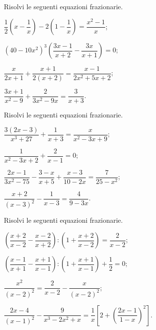 \begin{esercizio}[\Ast]
\label{ese:18.14}
Risolvi le seguenti equazioni frazionarie.
\begin{multicols}{2}
\begin{enumeratea}
 \item $\dfrac{1}{2} \left(x-\dfrac{1}{x}\right)-2\left(1-\dfrac{1}{x}\right)=\dfrac{x^{2}-1}{x}$;
 \item $\left(40-10x^{2}\right)^{3} \left(\dfrac{3x-1}{x+2}-\dfrac{3x}{x+1}\right)=0$;
 \item $\dfrac{x}{2x+1}+\dfrac{x+1}{2(x+2)}=\dfrac{x-1}{2x^{2}+5x+2}$;
 \item $\dfrac{3x+1}{x^{2}-9}+\dfrac{2}{3x^{2}-9x}=\dfrac{3}{x+3}$.
\end{enumeratea}
\end{multicols}
\end{esercizio}

\begin{esercizio}[\Ast]
\label{ese:18.15}
Risolvi le seguenti equazioni frazionarie.
\begin{multicols}{2}
\begin{enumeratea}
 \item $\dfrac{3(2x-3)}{x^{3}+27}+\dfrac{1}{x+3}=\dfrac{x}{x^{2}-3x+9}$;
 \item $\dfrac{1}{x^{2}-3x+2}+\dfrac{2}{x-1}=0$;
 \item $\dfrac{2x-1}{3x^{2}-75}-\dfrac{3-x}{x+5}+\dfrac{x-3}{10-2x}=\dfrac{7}{25-x^{2}}$;
 \item $\dfrac{x+2}{(x-3)^{2}}-\dfrac{1}{x-3}=\dfrac{4}{9-3x}$.
\end{enumeratea}
\end{multicols}
\end{esercizio}

\begin{esercizio}[\Ast]
\label{ese:18.16}
Risolvi le seguenti equazioni frazionarie.
\begin{enumeratea}
 \item $\left(\dfrac{x+2}{x-2}-\dfrac{x-2}{x+2}\right):\left(1+\dfrac{x+2}{x-2}\right)=\dfrac{2}{x-2}$;
 \item $\left(\dfrac{x-1}{x+1}-\dfrac{x+1}{x-1}\right):\left(1+\dfrac{x+1}{x-1}\right)+\dfrac{1}{2}=0$;
 \item $\dfrac{x^{2}}{(x-2)^{2}}=\dfrac{2}{x-2}-\dfrac{x}{(x-2)^{2}}$;
 \item $\dfrac{2x-4}{(x-1)^{2}}-\dfrac{9}{x^{3}-2x^{2}+x}=\dfrac{1}{x}\left[2+\left(\dfrac{2x-1}{1-x}\right)^{2}\right]$.
\end{enumeratea}
\end{esercizio}

